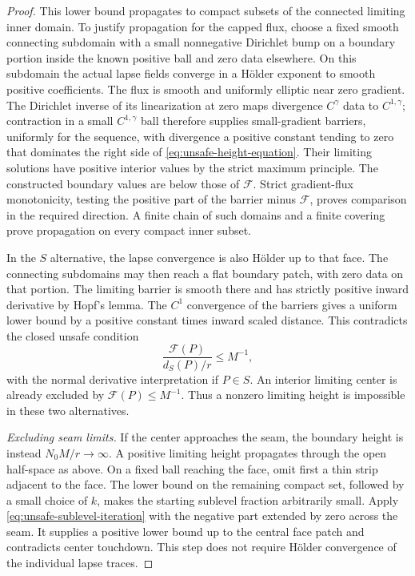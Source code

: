 \begin{proof}
This lower bound propagates to compact subsets of the connected
limiting inner domain.  To justify propagation for the capped flux,
choose a fixed smooth connecting subdomain with a small nonnegative
Dirichlet bump on a boundary portion inside the known positive ball
and zero data elsewhere.  On this subdomain the actual lapse fields
converge in a H\"older exponent to smooth positive coefficients.
The flux is smooth and uniformly elliptic near zero gradient.  The
Dirichlet inverse of its linearization at zero maps divergence
\(C^\gamma\) data to \(C^{1,\gamma}\); contraction in a small
\(C^{1,\gamma}\) ball therefore supplies small-gradient barriers,
uniformly for the sequence, with divergence a positive constant
tending to zero that dominates the right side of
\eqref{eq:unsafe-height-equation}.  Their limiting solutions have
positive interior values by the strict maximum principle.  The
constructed boundary values are below those of \(\mathcal F\).
Strict gradient-flux monotonicity, testing the positive part of the
barrier minus \(\mathcal F\), proves comparison in the required
direction.  A finite chain of such domains and a finite covering
prove propagation on every compact inner subset.

In the \(S\) alternative, the lapse convergence is also H\"older
up to that face.  The connecting subdomains may then reach a flat
boundary patch, with zero data on that portion.  The limiting
barrier is smooth there and has strictly positive inward derivative
by Hopf's lemma.  The \(C^1\) convergence of the barriers gives
a uniform lower bound by a positive constant times inward scaled
distance.  This contradicts the closed unsafe condition
\begin{equation}
 \frac{\mathcal F(P)}{d_S(P)/r}\le M^{-1},
 \label{eq:unsafe-boundary-touchdown}
\end{equation}
with the normal derivative interpretation if \(P\in S\).
An interior limiting center is already excluded by
\(\mathcal F(P)\le M^{-1}\).  Thus a nonzero limiting height
is impossible in these two alternatives.

\smallskip\noindent\emph{Excluding seam limits.}
If the center approaches the seam, the boundary height is instead
\(N_0M/r\to\infty\).  A positive limiting height propagates
through the open half-space as above.  On a fixed ball reaching the
face, omit first a thin strip adjacent to the face.  The lower
bound on the remaining compact set, followed by a small choice of
\(k\), makes the starting sublevel fraction arbitrarily small.
Apply \eqref{eq:unsafe-sublevel-iteration} with the negative part
extended by zero across the seam.  It supplies a positive lower
bound up to the central face patch and contradicts center
touchdown.  This step does not require H\"older convergence of
the individual lapse traces.


\end{proof}
